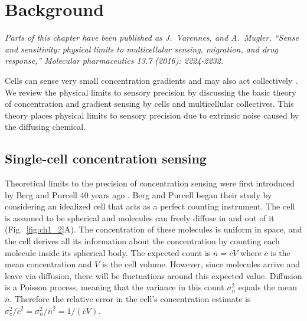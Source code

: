 
\chapter{Background}

\textit{Parts of this chapter have been published as J.\ Varennes, and A.\ Mugler, ``Sense and sensitivity: physical limits to multicellular sensing, migration, and drug response,'' Molecular pharmaceutics 13.7 (2016): 2224-2232.}
\vspace{5mm}

Cells can sense very small concentration gradients \cite{shields2007autologous} and may also act collectively
\cite{cheung2013collective, friedl2012classifying, aceto2014circulating, puliafito2015three}.
We review the physical limits to sensory precision by discussing the basic theory of concentration and gradient sensing by cells and multicellular collectives. This theory places physical limits to sensory precision due to extrinsic noise caused by the diffusing chemical.

\section{Single-cell concentration sensing}

Theoretical limits to the precision of concentration sensing were first introduced by Berg and Purcell 40 years ago \cite{berg1977physics}. Berg and Purcell began their study by considering an idealized cell that acts as a perfect counting instrument. The cell is assumed to be spherical and molecules can freely diffuse in and out of it (Fig.\ \ref{fig:ch1_2}A). The concentration of these molecules is uniform in space, and the cell derives all its information about the concentration by counting each molecule inside its spherical body. The expected count is
$\bar{n} = \bar{c}V$ where $\bar{c}$
is the mean concentration and $V$ is the cell volume. However, since molecules arrive and leave via diffusion, there will be fluctuations around this expected value. Diffusion is a Poisson process, meaning that the variance in this count $\sigma_n^2$ equals the mean $\bar{n}$. Therefore the relative error in the cell's concentration estimate is
$\sigma^2_c/\bar{c}^2 = \sigma_n^2/\bar{n}^2 = 1/(\bar{c} V)$.

